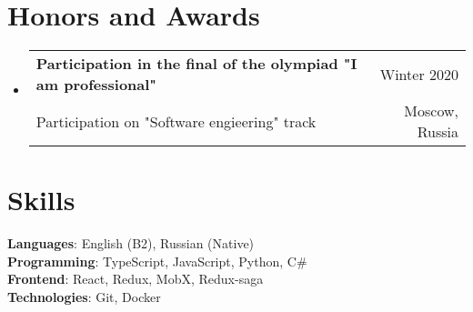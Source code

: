 \documentclass[A4,11pt]{article}
\makeatletter
\newcommand{\CVSubheading}[4]{
  \vspace{-2pt}\item
    \begin{tabular*}{0.97\textwidth}[t]{l@{\extracolsep{\fill}}r}
      \textbf{#1} & #2 \\
      \small#3 & \small #4 \\
    \end{tabular*}\vspace{-7pt}
}
\newcommand{\CVSubHeadingListStart}{\begin{itemize}[leftmargin=0.5cm, label={}]}
\newcommand{\CVSubHeadingListEnd}{\end{itemize}}
\makeatother
\begin{document}
\section{Honors and Awards}
  \CVSubHeadingListStart
    \CVSubheading
      {Participation in the final of the olympiad "I am professional"}{Winter 2020}
      {Participation on "Software engieering" track}{Moscow, Russia}
  \CVSubHeadingListEnd

\begin{comment}
This section is compressed from the various skills sections that Euro CV
recommends.
\end{comment}

\section{Skills}
 \begin{itemize}[leftmargin=0.5cm, label={}]
    \small{\item{
     \textbf{Languages}{: English (B2), Russian (Native) } \\
     \textbf{Programming}{: TypeScript, JavaScript, Python, C\# } \\
     \textbf{Frontend}{: React, Redux, MobX, Redux-saga } \\
     \textbf{Technologies}{: Git, Docker } \\
    }}
 \end{itemize}
    
\end{document}
